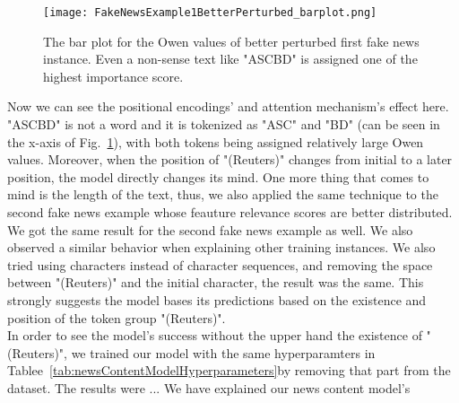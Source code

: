\begin{figure}
    \centering
    \texttt{[image: FakeNewsExample1BetterPerturbed\_barplot.png]}
    \caption[The bar plot for the Owen values of better perturbed first fake news instance.]{The bar plot for the Owen values of better perturbed first fake news instance. Even a non-sense text like "ASCBD" is assigned one of the highest importance score.}
    \label{fig:FakeNewsExample1BetterPerturbed_barplot}
\end{figure}
Now we can see the positional encodings' and attention mechanism's effect here. "ASCBD" is not a word and it is tokenized as "ASC" and "BD" (can be seen in the x-axis of Fig.~\ref{fig:FakeNewsExample1BetterPerturbed_barplot}), with both tokens being assigned relatively large Owen values. Moreover, when the position of "(Reuters)" changes from initial to a later position, the model directly changes its mind. One more thing that comes to mind is the length of the text, thus, we also applied the same technique to the second fake news example whose feauture relevance scores are better distributed. We got the same result for the second fake news example as well. We also observed a similar behavior when explaining other training instances. We also tried using characters instead of character sequences, and removing the space between "(Reuters)" and the initial character, the result was the same. This strongly suggests the model bases its predictions based on the existence and position of the token group "(Reuters)".\\
In order to see the model's success without the upper hand the existence of "(Reuters)", we trained our model with the same hyperparamters in Tablee~\ref{tab:newsContentModelHyperparameters}by removing that part from the dataset. The results were ...
We have explained our news content model's